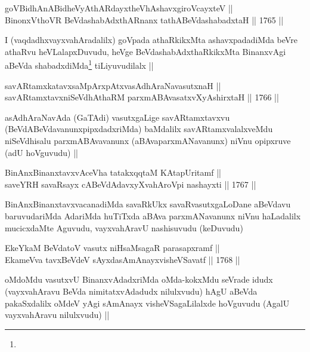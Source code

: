 \begin{shl}
goVBidhAnABidheVyAthARdayxtheVhAshavxgiroVcayxteV || \\
BinonxV\s thoVR BeVdashabAdxthARnanx tathA\s BeVdashabadxtaH ||  1765 ||  
\end{shl}

\begin{artha}
I (vaqdadhxvayxvahAradalilx) goVpada athaRkikxMta ashavxpadadiMda
beVre athaRvu heVLalapxDuvudu, heVge BeVdashabAdxthaRkikxMta
BinanxvAgi aBeVda shabadxdiMda\footnote[1]{} tiLiyuvudilalx ||
\end{artha}


\begin{shl}
savARtamxkatavxsaMpArxpAtxvasAdhAraNavasutxnaH || \\
savARtamxtavxniSeVdhAthaRM parxmABAvasatxvXyA\s \s shirxtaH ||  1766 ||  
\end{shl}

\begin{artha}
asAdhAraNavAda (GaTAdi) vasutxgaLige savARtamxtavxvu
(BeVdABeVdavanunxpipxdadxriMda) baMdalilx savARtamxvalalxveMdu
niSeVdhisalu parxmABAvavanunx (aBAvaparxmANavanunx) niVnu opipxruve
(adU hoVguvudu) || 
\end{artha}

\begin{shl}
BinAnxBinanxtavxvAceVha tatakxqqtaM KAtapUritamf || \\
saveYRH savaRsayx cABeVdAdavxyXvahAroV\s pi nashayxti ||  1767 || 
\end{shl}

\begin{artha}
BinAnxBinanxtavxvacanadiMda savaRkUkx savaRvasutxgaLoDane aBeVdavu
baruvudariMda AdariMda huTiTxda aBAva parxmANavanunx niVnu haLadalilx
mucicxdaMte Aguvudu, vayxvahAravU nashisuvudu (keDuvudu)
\end{artha}


\begin{shl}
EkeYkaM BeVdatoV vasutx niHsaMsagaR parasapxramf || \\
EkameVva tavxBeVdeV sAyxdasAmAnayxvisheVSavatf ||  1768 ||  
\end{shl}

\begin{artha}
oMdoMdu vasutxvU BinanxvAdadxriMda oMda-kokxMdu seVrade idudx
(vayxvahAravu BeVda nimitatxvAdadudx nilulxvudu) hAgU aBeVda
pakaSxdalilx oMdeV yAgi sAmAnayx visheVSagaLilalxde hoVguvudu (AgalU
vayxvahAravu nilulxvudu) ||
\end{artha}


